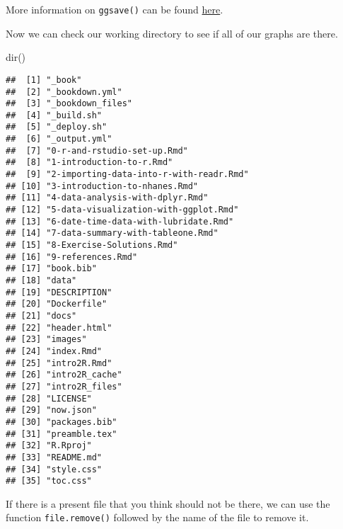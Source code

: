 \documentclass[
]{book}
\newenvironment{Shaded}{\begin{snugshade}}{\end{snugshade}}
\newcommand{\FunctionTok}[1]{\textcolor[rgb]{0.00,0.00,0.00}{#1}}
\newcommand{\NormalTok}[1]{#1}
\begin{document}
More information on \texttt{ggsave()} can be found \href{https://www.rdocumentation.org/packages/ggplot2/versions/3.3.3/topics/ggsave}{here}.

Now we can check our working directory to see if all of our graphs are there.

\begin{Shaded}
\begin{Highlighting}[]
\FunctionTok{dir}\NormalTok{()}
\end{Highlighting}
\end{Shaded}

\begin{verbatim}
##  [1] "_book"                                 
##  [2] "_bookdown.yml"                         
##  [3] "_bookdown_files"                       
##  [4] "_build.sh"                             
##  [5] "_deploy.sh"                            
##  [6] "_output.yml"                           
##  [7] "0-r-and-rstudio-set-up.Rmd"            
##  [8] "1-introduction-to-r.Rmd"               
##  [9] "2-importing-data-into-r-with-readr.Rmd"
## [10] "3-introduction-to-nhanes.Rmd"          
## [11] "4-data-analysis-with-dplyr.Rmd"        
## [12] "5-data-visualization-with-ggplot.Rmd"  
## [13] "6-date-time-data-with-lubridate.Rmd"   
## [14] "7-data-summary-with-tableone.Rmd"      
## [15] "8-Exercise-Solutions.Rmd"              
## [16] "9-references.Rmd"                      
## [17] "book.bib"                              
## [18] "data"                                  
## [19] "DESCRIPTION"                           
## [20] "Dockerfile"                            
## [21] "docs"                                  
## [22] "header.html"                           
## [23] "images"                                
## [24] "index.Rmd"                             
## [25] "intro2R.Rmd"                           
## [26] "intro2R_cache"                         
## [27] "intro2R_files"                         
## [28] "LICENSE"                               
## [29] "now.json"                              
## [30] "packages.bib"                          
## [31] "preamble.tex"                          
## [32] "R.Rproj"                               
## [33] "README.md"                             
## [34] "style.css"                             
## [35] "toc.css"
\end{verbatim}

If there is a present file that you think should not be there, we can use the function \texttt{file.remove()} followed by the name of the file to remove it.
\end{document}
